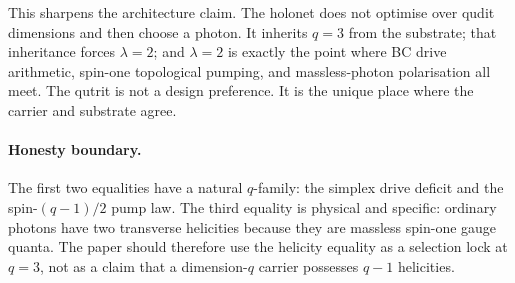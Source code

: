 This sharpens the architecture claim.  The holonet does not optimise over
qudit dimensions and then choose a photon.  It inherits $q=3$ from the substrate;
that inheritance forces $\lambda=2$; and $\lambda=2$ is exactly the point where
BC drive arithmetic, spin-one topological pumping, and massless-photon
polarisation all meet.  The qutrit is not a design preference.  It is the unique
place where the carrier and substrate agree.

\paragraph{Honesty boundary.}
The first two equalities have a natural $q$-family: the simplex drive deficit and
the spin-$(q-1)/2$ pump law.  The third equality is physical and specific:
ordinary photons have two transverse helicities because they are massless
spin-one gauge quanta.  The paper should therefore use the helicity equality as
a selection lock at $q=3$, not as a claim that a dimension-$q$ carrier possesses
$q-1$ helicities.
